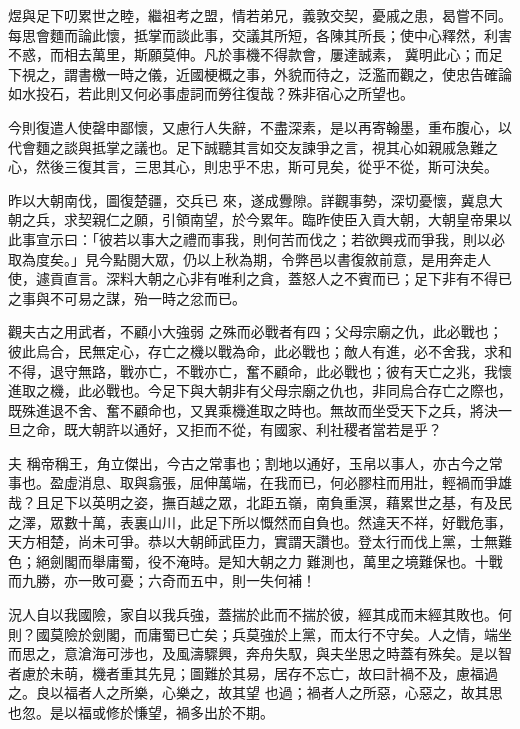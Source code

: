 \begin{pinyinscope}
 煜與足下叨累世之睦，繼祖考之盟，情若弟兄，義敦交契，憂戚之患，曷嘗不同。每思會麵而論此懷，抵掌而談此事，交議其所短，各陳其所長；使中心釋然，利害不惑，而相去萬里，斯願莫伸。凡於事機不得款會，屢達誠素，
 冀明此心；而足下視之，謂書檄一時之儀，近國梗概之事，外貌而待之，泛濫而觀之，使忠告確論如水投石，若此則又何必事虛詞而勞往復哉？殊非宿心之所望也。



 今則復遣人使罄申鄙懷，又慮行人失辭，不盡深素，是以再寄翰墨，重布腹心，以代會麵之談與抵掌之議也。足下誠聽其言如交友諫爭之言，視其心如親戚急難之心，然後三復其言，三思其心，則忠乎不忠，斯可見矣，從乎不從，斯可決矣。



 昨以大朝南伐，圖復楚疆，交兵已
 來，遂成釁隙。詳觀事勢，深切憂懷，冀息大朝之兵，求契親仁之願，引領南望，於今累年。臨昨使臣入貢大朝，大朝皇帝果以此事宣示曰：「彼若以事大之禮而事我，則何苦而伐之；若欲興戎而爭我，則以必取為度矣。」見今點閱大眾，仍以上秋為期，令弊邑以書復敘前意，是用奔走人使，遽貢直言。深料大朝之心非有唯利之貪，蓋怒人之不賓而已；足下非有不得已之事與不可易之謀，殆一時之忿而已。



 觀夫古之用武者，不顧小大強弱
 之殊而必戰者有四；父母宗廟之仇，此必戰也；彼此烏合，民無定心，存亡之機以戰為命，此必戰也；敵人有進，必不舍我，求和不得，退守無路，戰亦亡，不戰亦亡，奮不顧命，此必戰也；彼有天亡之兆，我懷進取之機，此必戰也。今足下與大朝非有父母宗廟之仇也，非同烏合存亡之際也，既殊進退不舍、奮不顧命也，又異乘機進取之時也。無故而坐受天下之兵，將決一旦之命，既大朝許以通好，又拒而不從，有國家、利社稷者當若是乎？



 夫
 稱帝稱王，角立傑出，今古之常事也；割地以通好，玉帛以事人，亦古今之常事也。盈虛消息、取與翕張，屈伸萬端，在我而已，何必膠柱而用壯，輕禍而爭雄哉？且足下以英明之姿，撫百越之眾，北距五嶺，南負重溟，藉累世之基，有及民之澤，眾數十萬，表裏山川，此足下所以慨然而自負也。然違天不祥，好戰危事，天方相楚，尚未可爭。恭以大朝師武臣力，實謂天讚也。登太行而伐上黨，士無難色；絕劍閣而舉庸蜀，役不淹時。是知大朝之力
 難測也，萬里之境難保也。十戰而九勝，亦一敗可憂；六奇而五中，則一失何補！



 況人自以我國險，家自以我兵強，蓋揣於此而不揣於彼，經其成而末經其敗也。何則？國莫險於劍閣，而庸蜀已亡矣；兵莫強於上黨，而太行不守矣。人之情，端坐而思之，意滄海可涉也，及風濤驟興，奔舟失馭，與夫坐思之時蓋有殊矣。是以智者慮於未萌，機者重其先見；圖難於其易，居存不忘亡，故曰計禍不及，慮福過之。良以福者人之所樂，心樂之，故其望
 也過；禍者人之所惡，心惡之，故其思也忽。是以福或修於慊望，禍多出於不期。




\end{pinyinscope}
